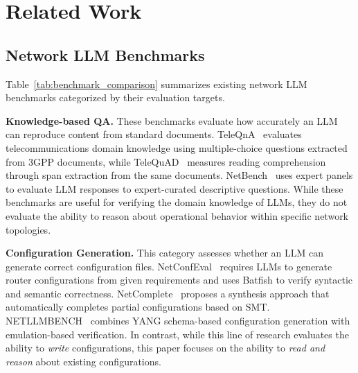 \section{Related Work}

\subsection{Network LLM Benchmarks}


Table~\ref{tab:benchmark_comparison} summarizes existing network LLM benchmarks categorized by their evaluation targets.

\textbf{Knowledge-based QA.}
These benchmarks evaluate how accurately an LLM can reproduce content from standard documents.
TeleQnA~\cite{ref9} evaluates telecommunications domain knowledge using multiple-choice questions extracted from 3GPP documents, while TeleQuAD~\cite{ref10} measures reading comprehension through span extraction from the same documents.
NetBench~\cite{ref11} uses expert panels to evaluate LLM responses to expert-curated descriptive questions.
While these benchmarks are useful for verifying the domain knowledge of LLMs, they do not evaluate the ability to reason about operational behavior within specific network topologies.

\textbf{Configuration Generation.}
This category assesses whether an LLM can generate correct configuration files.
NetConfEval~\cite{wang2024netconfeval} requires LLMs to generate router configurations from given requirements and uses Batfish to verify syntactic and semantic correctness.
NetComplete~\cite{ref28} proposes a synthesis approach that automatically completes partial configurations based on SMT.
NETLLM\allowbreak BENCH~\cite{ref12} combines YANG schema-based configuration generation with emulation-based verification.
In contrast, while this line of research evaluates the ability to \emph{write} configurations, this paper focuses on the ability to \emph{read and reason} about existing configurations.



